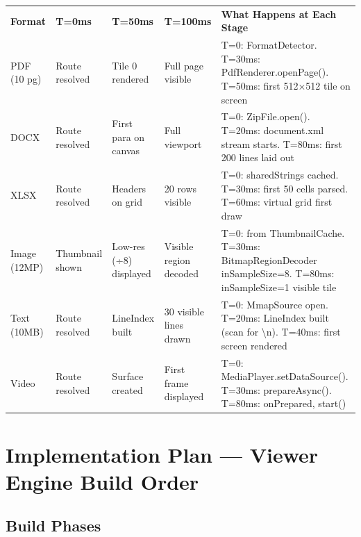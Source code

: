 \documentclass[12pt,a4paper]{report}
\newcommand{\ra}[1]{\renewcommand{\arraystretch}{#1}}
\newcommand{\TH}[1]{\rowcolor{P1}\color{white}\bfseries #1}
\newcommand{\PB}{\newpage}
\begin{document}
\begin{center}\ra{1.35}
\begin{tabular}{L{2.4cm} L{2.0cm} L{2.0cm} L{2.0cm} L{5.4cm}}
\TH{Format} & \TH{T=0ms} & \TH{T=50ms} & \TH{T=100ms} & \TH{What Happens at Each Stage} \\
 PDF (10 pg) & Route resolved & Tile 0 rendered & Full page visible &
  T=0: FormatDetector. T=30ms: PdfRenderer.openPage(). T=50ms: first 512×512 tile on screen \\
 DOCX & Route resolved & First para on canvas & Full viewport &
  T=0: ZipFile.open(). T=20ms: document.xml stream starts. T=80ms: first 200 lines laid out \\
 XLSX & Route resolved & Headers on grid & 20 rows visible &
  T=0: sharedStrings cached. T=30ms: first 50 cells parsed. T=60ms: virtual grid first draw \\
 Image (12MP) & Thumbnail shown & Low-res (÷8) displayed & Visible region decoded &
  T=0: from ThumbnailCache. T=30ms: BitmapRegionDecoder inSampleSize=8. T=80ms: inSampleSize=1 visible tile \\
 Text (10MB) & Route resolved & LineIndex built & 30 visible lines drawn &
  T=0: MmapSource open. T=20ms: LineIndex built (scan for \textbackslash n). T=40ms: first screen rendered \\
 Video & Route resolved & Surface created & First frame displayed &
  T=0: MediaPlayer.setDataSource(). T=30ms: prepareAsync(). T=80ms: onPrepared, start() \\
\end{tabular}
\end{center}

\PB

\chapter{Implementation Plan — Viewer Engine Build Order}

\section{Build Phases}
\end{document}
